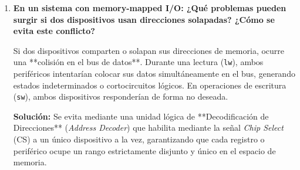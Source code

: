 \documentclass[12pt,letterpaper]{article}
\begin{document}
\begin{enumerate}
    \vspace{0.2cm}
    \begin{itemize}
        \item \textbf{Diferencia Principal:} \textit{Memory-Mapped I/O} utiliza el mismo espacio de direcciones y bus para la RAM y los periféricos. Por otro lado, la \textit{E/S por puertos} (Port-Mapped I/O) posee un espacio de direcciones aislado y requiere instrucciones dedicadas (como \texttt{IN} y \texttt{OUT} en x86).
        \item \textbf{Ventajas y Desventajas:}
        \begin{itemize}
            \item \textit{Memory-Mapped I/O:} **Ventaja:** Simplifica el hardware del procesador al no requerir un bus de control extra ni instrucciones exclusivas. Permite usar todos los modos de direccionamiento sobre los periféricos. **Desventaja:** Consume parte del espacio de direccionamiento de memoria RAM principal.
            \item \textit{Port-Mapped I/O:} **Ventaja:** No reduce el espacio de direcciones de la memoria principal. **Desventaja:** Requiere instrucciones adicionales y circuitos de decodificación más complejos en la CPU.
        \end{itemize}
        \item \textbf{Uso en MIPS32:} MIPS32 sigue la filosofía RISC de mantener un conjunto de instrucciones simple y homogéneo. Utilizar \textit{Memory-Mapped I/O} evita la adición de instrucciones de E/S al ISA, optimizando el diseño del camino de datos.
    \end{itemize}

    \item \textbf{\large\color{UCBlue}En un sistema con memory-mapped I/O: ¿Qué problemas pueden surgir si dos dispositivos usan direcciones solapadas? ¿Cómo se evita este conflicto?}
    
    \vspace{0.2cm}
    Si dos dispositivos comparten o solapan sus direcciones de memoria, ocurre una **colisión en el bus de datos**. Durante una lectura (\texttt{lw}), ambos periféricos intentarían colocar sus datos simultáneamente en el bus, generando estados indeterminados o cortocircuitos lógicos. En operaciones de escritura (\texttt{sw}), ambos dispositivos responderían de forma no deseada.
    
    \textbf{Solución:} Se evita mediante una unidad lógica de **Decodificación de Direcciones** (\textit{Address Decoder}) que habilita mediante la señal \textit{Chip Select} (CS) a un único dispositivo a la vez, garantizando que cada registro o periférico ocupe un rango estrictamente disjunto y único en el espacio de memoria.


\end{enumerate}
\end{document}

